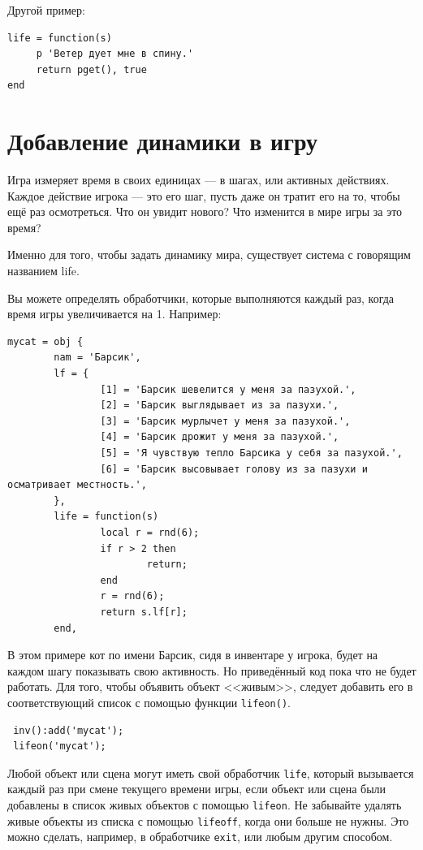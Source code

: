 \documentclass[a4paper,12pt]{article}
\begin{document}
Другой пример:

\begin{verbatim}
life = function(s)
     p 'Ветер дует мне в спину.'
     return pget(), true
end
\end{verbatim}

\section{Добавление динамики в игру}

Игра измеряет время в своих единицах --- в шагах, или активных действиях. Каждое действие игрока --- это его шаг, пусть даже он тратит его на то, чтобы ещё раз осмотреться. Что он увидит нового? Что изменится в мире игры за это время?

Именно для того, чтобы задать динамику мира, существует система с говорящим названием life.

Вы можете определять обработчики, которые выполняются каждый раз, когда время игры увеличивается на 1. Например:

\begin{verbatim}
mycat = obj {
        nam = 'Барсик',
        lf = {
                [1] = 'Барсик шевелится у меня за пазухой.',
                [2] = 'Барсик выглядывает из за пазухи.',
                [3] = 'Барсик мурлычет у меня за пазухой.',
                [4] = 'Барсик дрожит у меня за пазухой.',
                [5] = 'Я чувствую тепло Барсика у себя за пазухой.',
                [6] = 'Барсик высовывает голову из за пазухи и осматривает местность.',
        },
        life = function(s)
                local r = rnd(6);
                if r > 2 then
                        return;
                end
                r = rnd(6);
                return s.lf[r];
        end,
\end{verbatim}

В этом примере кот по имени Барсик, сидя в инвентаре у игрока, будет на каждом шагу показывать свою активность. Но приведённый код пока что не будет работать. Для того, чтобы объявить объект <<живым>>, следует добавить его в соответствующий список с помощью функции \verb/lifeon()/.

\begin{verbatim}
 inv():add('mycat');
 lifeon('mycat');
\end{verbatim}

Любой объект или сцена могут иметь свой обработчик \verb/life/, который вызывается каждый раз при смене текущего времени игры, если объект или сцена были добавлены в список живых объектов с помощью \verb/lifeon/. Не забывайте удалять живые объекты из списка с помощью \verb/lifeoff/, когда они больше не нужны. Это можно сделать, например, в обработчике \verb/exit/, или любым другим способом.
\end{document}
